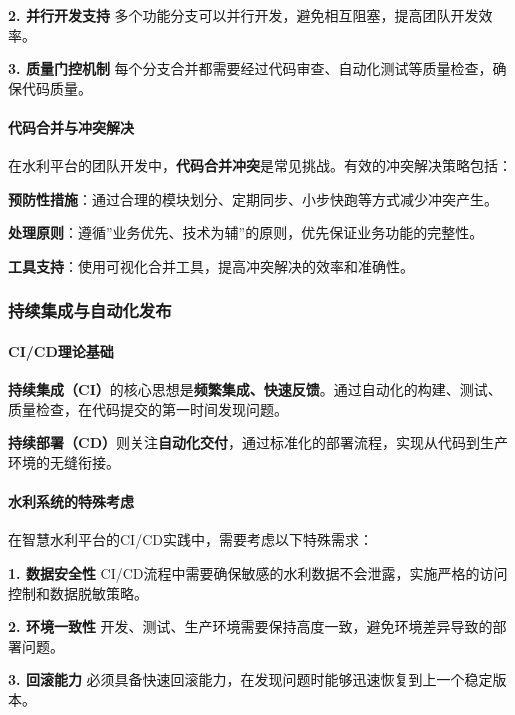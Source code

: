 \textbf{2. 并行开发支持} 多个功能分支可以并行开发，避免相互阻塞，提高团队开发效率。

\textbf{3. 质量门控机制} 每个分支合并都需要经过代码审查、自动化测试等质量检查，确保代码质量。

\paragraph{代码合并与冲突解决}\label{ux4ee3ux7801ux5408ux5e76ux4e0eux51b2ux7a81ux89e3ux51b3}

在水利平台的团队开发中，\textbf{代码合并冲突}是常见挑战。有效的冲突解决策略包括：

\textbf{预防性措施}：通过合理的模块划分、定期同步、小步快跑等方式减少冲突产生。

\textbf{处理原则}：遵循''业务优先、技术为辅''的原则，优先保证业务功能的完整性。

\textbf{工具支持}：使用可视化合并工具，提高冲突解决的效率和准确性。

\subsubsection{持续集成与自动化发布}\label{ux6301ux7eedux96c6ux6210ux4e0eux81eaux52a8ux5316ux53d1ux5e03}

\paragraph{CI/CD理论基础}\label{cicdux7406ux8bbaux57faux7840}

\textbf{持续集成（CI）}的核心思想是\textbf{频繁集成、快速反馈}。通过自动化的构建、测试、质量检查，在代码提交的第一时间发现问题。

\textbf{持续部署（CD）}则关注\textbf{自动化交付}，通过标准化的部署流程，实现从代码到生产环境的无缝衔接。

\paragraph{水利系统的特殊考虑}\label{ux6c34ux5229ux7cfbux7edfux7684ux7279ux6b8aux8003ux8651}

在智慧水利平台的CI/CD实践中，需要考虑以下特殊需求：

\textbf{1. 数据安全性} CI/CD流程中需要确保敏感的水利数据不会泄露，实施严格的访问控制和数据脱敏策略。

\textbf{2. 环境一致性} 开发、测试、生产环境需要保持高度一致，避免环境差异导致的部署问题。

\textbf{3. 回滚能力} 必须具备快速回滚能力，在发现问题时能够迅速恢复到上一个稳定版本。


